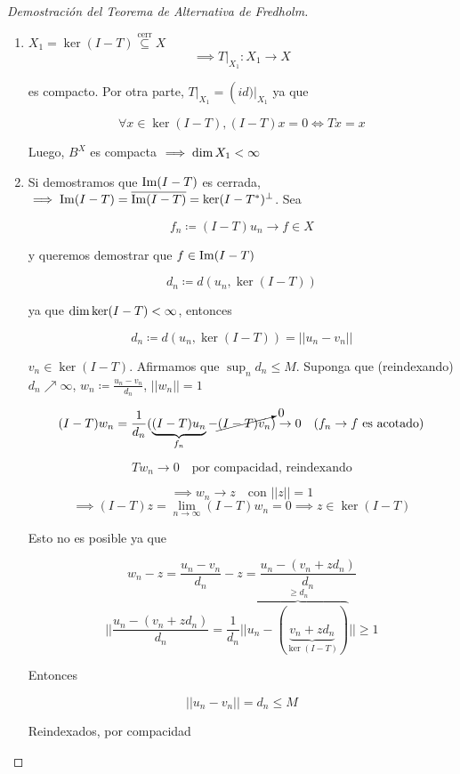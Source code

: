 \begin{proof}[Demostración del Teorema de Alternativa de Fredholm]
   \begin{enumerate}[label=\alph*)]
      \item $X_1=\ker(I-T)\overset{\text{cerr}}{\subseteq} X$
      \[\implies T\big\rvert_{X_1}:X_1\to X\]

      es compacto. Por otra parte, $T\big\rvert_{X_1}=\operatorname(id)\big|_{X_1}$ ya que 

      \[\forall x\in \ker(I-T), (I-T)x=0\iff Tx=x\]

      Luego, $B^X$ es compacta $\implies \operatorname{dim} X_1<\infty$ 

      \item Si demostramos que $\operatorname{Im}(I-T)$ es cerrada, $\implies \operatorname{Im}(I-T)=\overline{\operatorname{Im}(I-T)}=\ker(I-T^*)^\perp$. Sea 
      
      \[f_n\coloneqq (I-T)u_n\to f\in X\]

      y queremos demostrar que $f\in \operatorname{Im}(I-T)$

      \[d_n\coloneqq d(u_n,\ker(I-T))\]

      ya que $\operatorname{dim}\ker(I-T)<\infty$, entonces 

      \[d_n\coloneqq d(u_n,\ker(I-T))=||u_n-v_n||\]

      $v_n\in \ker (I-T)$. Afirmamos que $\sup_n d_n\leq M$. Suponga que (reindexando) $d_n\nearrow \infty$, $w_n\coloneqq \frac{u_n-v_n}{d_n}$, $||w_n||=1$

      \begin{align*}
         (I-T)w_n =\frac{1}{d_n}(\underbrace{(I-T)u_n}_{f_n}-\cancelto{0}{(I-T)v_n})\to 0\quad (f_n\to f\text{ es acotado})
      \end{align*}

      \[T w_n\to 0\quad \text{por compacidad, reindexando}\]

      \[\implies w_n\to z\quad\text{con }||z||=1\]
      \[\implies (I-T)z=\lim_{n\to\infty} (I-T)w_n=0\implies z\in \ker (I-T)\]

      Esto no es posible ya que 

      \[w_n-z=\frac{u_n-v_n}{d_n}-z=\frac{u_n-(v_n+zd_n)}{d_n}\]
      \[||\frac{u_n-(v_n+zd_n)}{d_n}=\frac{1}{d_n}||\overbrace{u_n-(\underbrace{v_n+zd_n}_{\ker (I-T)})}^{\geq d_n}||\geq 1\]

      Entonces 

      \[||u_n-v_n||=d_n\leq M\]

      Reindexados, por compacidad 


\end{enumerate}
\end{proof}
